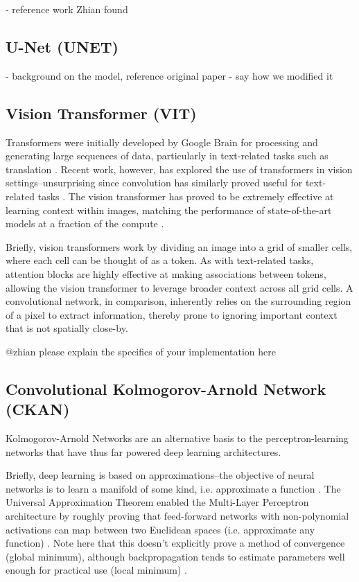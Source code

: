 \documentclass[conference]{IEEEtran}
\begin{document}
- reference work Zhian found


\subsection{U-Net (UNET)}
- background on the model, reference original paper
- say how we modified it


\subsection{Vision Transformer (VIT)}
Transformers were initially developed by Google Brain for processing and generating large sequences of data, particularly in text-related tasks such as translation \cite{transformer}. Recent work, however, has explored the use of transformers in vision settings--unsurprising since convolution has similarly proved useful for text-related tasks \cite{VIT} \cite{transformer}. The vision transformer has proved to be extremely effective at learning context within images, matching the performance of state-of-the-art models at a fraction of the compute \cite{VIT}.

Briefly, vision transformers work by dividing an image into a grid of smaller cells, where each cell can be thought of as a token. As with text-related tasks, attention blocks are highly effective at making associations between tokens, allowing the vision transformer to leverage broader context across all grid cells. A convolutional network, in comparison, inherently relies on the surrounding region of a pixel to extract information, thereby prone to ignoring important context that is not spatially close-by.

@zhian please explain the specifics of your implementation here


\subsection{Convolutional Kolmogorov-Arnold Network (CKAN)}
Kolmogorov-Arnold Networks are an alternative basis to the perceptron-learning networks that have thus far powered deep learning architectures.

Briefly, deep learning is based on approximations--the objective of neural networks is to learn a manifold of some kind, i.e. approximate a function \cite{mlp_approx_thm}. The Universal Approximation Theorem enabled the Multi-Layer Perceptron architecture by roughly proving that feed-forward networks with non-polynomial activations can map between two Euclidean spaces (i.e. approximate any function) \cite{mlp_approx_thm}. Note here that this doesn't explicitly prove a method of convergence (global minimum), although backpropagation tends to estimate parameters well enough for practical use (local minimum) \cite{mlp_approx_thm}.
\end{document}
